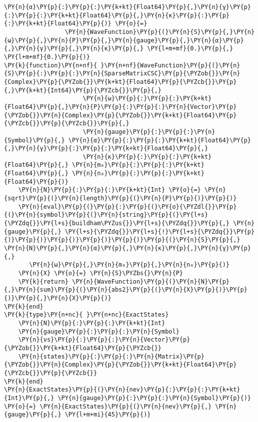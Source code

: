 \begin{Verbatim}[commandchars=\\\{\}]
             \PY{n}{α}\PY{p}{:}\PY{p}{:}\PY{k+kt}{Float64}\PY{p}{,}\PY{n}{γ}\PY{p}{:}\PY{p}{:}\PY{k+kt}{Float64}\PY{p}{,}\PY{n}{κ}\PY{p}{:}\PY{p}{:}\PY{k+kt}{Float64}\PY{p}{)} \PY{o}{=}
                 \PY{n}{WaveFunction}\PY{p}{(}\PY{n}{S}\PY{p}{,}\PY{n}{ω}\PY{p}{,}\PY{n}{P}\PY{p}{,}\PY{n}{gauge}\PY{p}{,}\PY{n}{α}\PY{p}{,}\PY{n}{γ}\PY{p}{,}\PY{n}{κ}\PY{p}{,} \PY{l+m+mf}{0.}\PY{p}{,} \PY{l+m+mf}{0.}\PY{p}{)}
\PY{k}{function}\PY{n+nf}{ }\PY{n+nf}{WaveFunction}\PY{p}{(}\PY{n}{S}\PY{p}{:}\PY{p}{:}\PY{n}{SparseMatrixCSC}\PY{p}{\PYZob{}}\PY{n}{Complex}\PY{p}{\PYZob{}}\PY{k+kt}{Float64}\PY{p}{\PYZcb{}}\PY{p}{,}\PY{k+kt}{Int64}\PY{p}{\PYZcb{}}\PY{p}{,}
                      \PY{n}{ω}\PY{p}{:}\PY{p}{:}\PY{k+kt}{Float64}\PY{p}{,}\PY{n}{P}\PY{p}{:}\PY{p}{:}\PY{n}{Vector}\PY{p}{\PYZob{}}\PY{n}{Complex}\PY{p}{\PYZob{}}\PY{k+kt}{Float64}\PY{p}{\PYZcb{}}\PY{p}{\PYZcb{}}\PY{p}{,}
                      \PY{n}{gauge}\PY{p}{:}\PY{p}{:}\PY{n}{Symbol}\PY{p}{,} \PY{n}{α}\PY{p}{:}\PY{p}{:}\PY{k+kt}{Float64}\PY{p}{,}\PY{n}{γ}\PY{p}{:}\PY{p}{:}\PY{k+kt}{Float64}\PY{p}{,}
                      \PY{n}{κ}\PY{p}{:}\PY{p}{:}\PY{k+kt}{Float64}\PY{p}{,} \PY{n}{m₀}\PY{p}{:}\PY{p}{:}\PY{k+kt}{Float64}\PY{p}{,} \PY{n}{n₀}\PY{p}{:}\PY{p}{:}\PY{k+kt}{Float64}\PY{p}{)}
    \PY{n}{N}\PY{p}{:}\PY{p}{:}\PY{k+kt}{Int} \PY{o}{=} \PY{n}{sqrt}\PY{p}{(}\PY{n}{length}\PY{p}{(}\PY{n}{P}\PY{p}{)}\PY{p}{)}
    \PY{n}{eval}\PY{p}{(}\PY{p}{:}\PY{p}{(}\PY{o}{\PYZdl{}}\PY{p}{(}\PY{n}{symbol}\PY{p}{(}\PY{n}{string}\PY{p}{(}\PY{l+s}{\PYZdq{}}\PY{l+s}{buildham\PYZus{}}\PY{l+s}{\PYZdq{}}\PY{p}{,} \PY{n}{gauge}\PY{p}{,} \PY{l+s}{\PYZdq{}}\PY{l+s}{!}\PY{l+s}{\PYZdq{}}\PY{p}{)}\PY{p}{)}\PY{p}{)}\PY{p}{)}\PY{p}{)}\PY{p}{(}\PY{n}{S}\PY{p}{,} \PY{n}{N}\PY{p}{,}\PY{n}{α}\PY{p}{,}\PY{n}{κ}\PY{p}{,}\PY{n}{γ}\PY{p}{,}
       \PY{n}{ω}\PY{p}{,}\PY{n}{m₀}\PY{p}{,}\PY{n}{n₀}\PY{p}{)}
    \PY{n}{X} \PY{o}{=} \PY{n}{S}\PYZbs{}\PY{n}{P}
    \PY{k}{return} \PY{n}{WaveFunction}\PY{p}{(}\PY{n}{N}\PY{p}{,}\PY{n}{sum}\PY{p}{(}\PY{n}{abs2}\PY{p}{(}\PY{n}{X}\PY{p}{)}\PY{p}{)}\PY{p}{,}\PY{n}{X}\PY{p}{)}
\PY{k}{end}
\PY{k}{type}\PY{n+nc}{ }\PY{n+nc}{ExactStates}
    \PY{n}{N}\PY{p}{:}\PY{p}{:}\PY{k+kt}{Int}
    \PY{n}{gauge}\PY{p}{:}\PY{p}{:}\PY{n}{Symbol}
    \PY{n}{νs}\PY{p}{:}\PY{p}{:}\PY{n}{Vector}\PY{p}{\PYZob{}}\PY{k+kt}{Float64}\PY{p}{\PYZcb{}}
    \PY{n}{states}\PY{p}{:}\PY{p}{:}\PY{n}{Matrix}\PY{p}{\PYZob{}}\PY{n}{Complex}\PY{p}{\PYZob{}}\PY{k+kt}{Float64}\PY{p}{\PYZcb{}}\PY{p}{\PYZcb{}}
\PY{k}{end}
\PY{n}{ExactStates}\PY{p}{(}\PY{n}{nev}\PY{p}{:}\PY{p}{:}\PY{k+kt}{Int}\PY{p}{,} \PY{n}{gauge}\PY{p}{:}\PY{p}{:}\PY{n}{Symbol}\PY{p}{)} \PY{o}{=} \PY{n}{ExactStates}\PY{p}{(}\PY{n}{nev}\PY{p}{,} \PY{n}{gauge}\PY{p}{,} \PY{l+m+mi}{45}\PY{p}{)}

\end{Verbatim}

